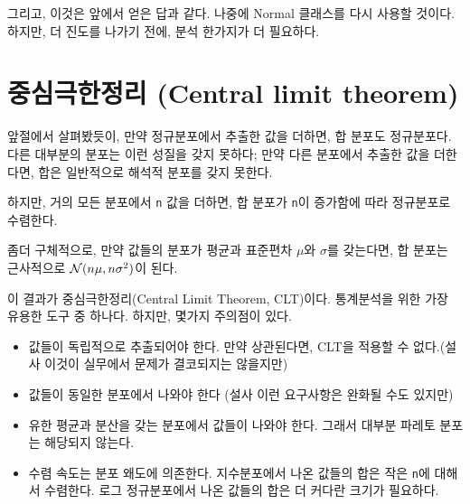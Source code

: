 그리고, 이것은 앞에서 얻은 답과 같다. 나중에 Normal 클래스를 다시 사용할 것이다. 하지만, 더 진도를 나가기 전에, 분석 한가지가 더 필요하다.


\section{중심극한정리 (Central limit theorem)}
\label{CLT}

앞절에서 살펴봤듯이, 만약 정규분포에서 추출한 값을 더하면, 합 분포도 정규분포다. 다른 대부분의 분포는 이런 성질을 갖지 못하다; 만약 다른 분포에서 추출한 값을 더한다면, 합은 일반적으로 해석적 분포를 갖지 못한다.
 
 

하지만, 거의 모든 분포에서 {\tt n} 값을 더하면, 합 분포가 {\tt n}이 증가함에 따라 정규분포로 수렴한다.

좀더 구체적으로, 만약 값들의 분포가 평균과 표준편차 $\mu$와 $\sigma$를 갖는다면, 합 분포는 근사적으로 $\mathcal{N}(n \mu, n \sigma^2)$이 된다.

이 결과가 중심극한정리(Central Limit Theorem, CLT)이다.  
통계분석을 위한 가장 유용한 도구 중 하나다. 하지만, 몇가지 주의점이 있다.

\begin{itemize}

\item 값들이 독립적으로 추출되어야 한다. 만약 상관된다면, CLT을 적용할 수 없다.(설사 이것이 실무에서 문제가 결코되지는 않을지만)

\item 값들이 동일한 분포에서 나와야 한다 (설사 이런 요구사항은 완화될 수도 있지만)

\item 유한 평균과 분산을 갖는 분포에서 값들이 나와야 한다. 그래서 대부분 파레토 분포는 해당되지 않는다.

\item 수렴 속도는 분포 왜도에 의존한다. 지수분포에서 나온 값들의 합은 작은 {\tt n}에 대해서 수렴한다. 로그 정규분포에서 나온 값들의 합은 더 커다란 크기가 필요하다.

\end{itemize}

